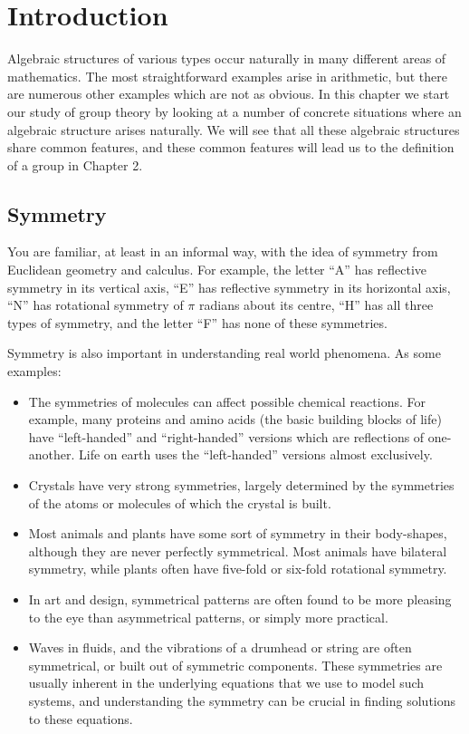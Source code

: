 \chapter{Introduction}

\pagestyle{draft}

Algebraic structures of various types occur naturally in many different areas
of mathematics.  The most straightforward examples arise in arithmetic, but
there are numerous other examples which are not as obvious.  In this chapter
we start our study of group theory by looking at a number of concrete
situations where an algebraic structure arises naturally.  We will see that all
these algebraic structures share common features, and these common features
will lead us to the definition of a group in Chapter 2.

\section{Symmetry}
\label{section:symmetry}

You are familiar, at least in an informal way, with the idea of symmetry from
Euclidean geometry and calculus.  For example, the letter ``\textsf{A}'' has
reflective symmetry in its vertical axis, ``\textsf{E}'' has reflective
symmetry in its horizontal axis, ``\textsf{N}'' has rotational symmetry of
$\pi$ radians about its centre, ``\textsf{H}'' has all three types of
symmetry, and the letter ``\textsf{F}'' has none of these symmetries.

Symmetry is also important in understanding real world phenomena.  As some
examples:
\begin{itemize}
  \item The symmetries of molecules can affect possible chemical reactions.
    For example, many proteins and amino acids (the basic building blocks of
    life) have ``left-handed'' and ``right-handed'' versions which are
    reflections of one-another.  Life on earth uses the ``left-handed''
    versions almost exclusively.
    
  \item Crystals have very strong symmetries, largely determined by the
    symmetries of the atoms or molecules of which the crystal is built.
    
  \item Most animals and plants have some sort of symmetry in their
    body-shapes, although they are never perfectly symmetrical.  Most
    animals have bilateral symmetry, while plants often have five-fold
    or six-fold rotational symmetry.
  
  \item In art and design, symmetrical patterns are often found to be more
    pleasing to the eye than asymmetrical patterns, or simply more practical.
    
  \item Waves in fluids, and the vibrations of a drumhead or string are often
    symmetrical, or built out of symmetric components.  These symmetries
    are usually inherent in the underlying equations that we use to model
    such systems, and understanding the symmetry can be crucial in finding
    solutions to these equations.
\end{itemize}

